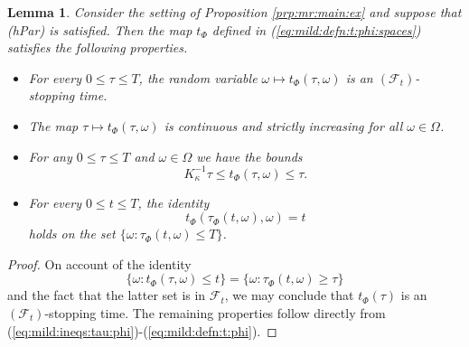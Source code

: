 \documentclass[10pt]{articleHJ}
\newcommand{\sref}[1]{(\ref{#1})}                       %
\newtheorem{lem}[thm]{Lemma}
\numberwithin{equation}{section}
\begin{document}
\begin{lem}
Consider the setting of Proposition \ref{prp:mr:main:ex} and suppose that (hPar) is satisfied.
Then the map $t_{\Phi}$ defined in \sref{eq:mild:defn:t:phi:spaces}
satisfies the following properties.
\begin{itemize}
\item[(i)]{
For every $0 \le \tau \le T$,
the random variable $\omega \mapsto t_{\Phi}(\tau, \omega)$
is an
$(\mathcal{F}_t)$-stopping time.
}
\item[(ii)]{
The map $\tau \mapsto t_{\Phi}(\tau, \omega)$
is  continuous and strictly increasing for all $\omega \in \Omega$.
}
\item[(iii)]{
For any $0 \le \tau \le T$ and $\omega \in \Omega$
we have the bounds
\begin{equation}
K_{\kappa}^{-1} \tau \le  t_\Phi(\tau, \omega) \le \tau.
\end{equation}
}
\item[(iv)]{
  For every $0 \le t \le T$,
  the identity
  \begin{equation}
    t_{\Phi}( \tau_\Phi(t, \omega), \omega ) =t
   \end{equation}
   holds on the set $\{\omega: \tau_\Phi(t, \omega) \le T\}$.
}
\end{itemize}
\end{lem}
\begin{proof}
On account of the identity
\begin{equation}
\{ \omega: t_{\Phi}(\tau, \omega) \le t \}
= \{ \omega: \tau_\Phi(t, \omega) \ge \tau \}
\end{equation}
and the fact that the latter set
is in $\mathcal{F}_t$, we may
conclude that $t_{\Phi}(\tau)$
is an
$(\mathcal{F}_t)$-stopping time.
The remaining properties follow
directly from
\sref{eq:mild:ineqs:tau:phi}-\sref{eq:mild:defn:t:phi}.
\end{proof}
\end{document}
